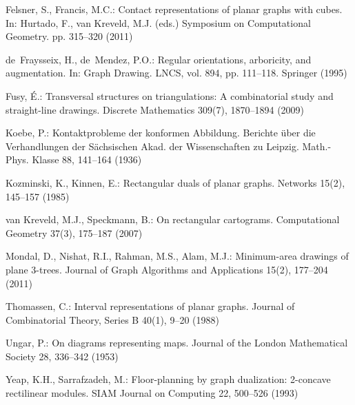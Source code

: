 \documentclass{llncs}
\begin{document}
{\begin{small}
\begin{thebibliography}{10}
Felsner, S., Francis, M.C.: Contact representations of planar graphs with
  cubes. In: Hurtado, F., van Kreveld, M.J. (eds.) Symposium on Computational
  Geometry. pp. 315--320 (2011)

de~Fraysseix, H., de~Mendez, P.O.: Regular orientations, arboricity, and
  augmentation. In: Graph Drawing. LNCS, vol. 894, pp. 111--118. Springer
  (1995)

Fusy, {\'E}.: Transversal structures on triangulations: A combinatorial study
  and straight-line drawings. Discrete Mathematics  309(7),  1870--1894 (2009)

Koebe, P.: {K}ontaktprobleme der konformen {A}bbildung. Berichte {\"u}ber die
  Verhandlungen der S{\"a}chsischen Akad. der Wissenschaften zu Leipzig.
  Math.-Phys. Klasse  88,  141--164 (1936)

Kozminski, K., Kinnen, E.: Rectangular duals of planar graphs. Networks  15(2),
   145--157 (1985)

van Kreveld, M.J., Speckmann, B.: On rectangular cartograms. Computational
  Geometry  37(3),  175--187 (2007)

Mondal, D., Nishat, R.I., Rahman, M.S., Alam, M.J.: Minimum-area drawings of
  plane 3-trees. Journal of Graph Algorithms and Applications  15(2),  177--204
  (2011)

Thomassen, C.: Interval representations of planar graphs. Journal of
  Combinatorial Theory, Series B  40(1),  9--20 (1988)

Ungar, P.: On diagrams representing maps. Journal of the London Mathematical
  Society  28,  336--342 (1953)

Yeap, K.H., Sarrafzadeh, M.: Floor-planning by graph dualization: 2-concave
  rectilinear modules. SIAM Journal on Computing  22,  500--526 (1993)

\end{thebibliography}
 \end{small}
}
\end{document}
